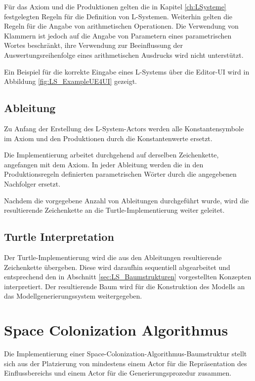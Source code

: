 Für das Axiom und die Produktionen gelten die in Kapitel \ref{ch:LSysteme} festgelegten Regeln für die Definition von L-Systemen. Weiterhin gelten die Regeln für die Angabe von arithmetischen Operationen. Die Verwendung von Klammern ist jedoch auf die Angabe von Parametern eines parametrischen Wortes beschränkt, ihre Verwendung zur Beeinflussung der Auswertungsreihenfolge eines arithmetischen Ausdrucks wird nicht unterstützt.

Ein Beispiel für die korrekte Eingabe eines L-Systems über die Editor-UI wird in Abbildung \ref{fig:LS_ExampleUE4UI} gezeigt.

\subsection{Ableitung}

Zu Anfang der Erstellung des L-System-Actors werden alle Konstantensymbole im Axiom und den Produktionen durch die Konstantenwerte ersetzt. 

Die Implementierung arbeitet durchgehend auf derselben Zeichenkette, angefangen mit dem Axiom. In jeder Ableitung werden die in den Produktionsregeln definierten parametrischen Wörter durch die angegebenen Nachfolger ersetzt.

Nachdem die vorgegebene Anzahl von Ableitungen durchgeführt wurde, wird die resultierende Zeichenkette an die Turtle-Implementierung weiter geleitet.

\subsection{Turtle Interpretation} \label{subsec:TurtleInterpretationImplementation}

Der Turtle-Implementierung wird die aus den Ableitungen resultierende Zeichenkette übergeben. Diese wird daraufhin sequentiell abgearbeitet und entsprechend den in Abschnitt \ref{sec:LS_Baumstrukturen} vorgestellten Konzepten interpretiert. Der resultierende Baum wird für die Konstruktion des Modells an das Modellgenerierungssystem weitergegeben.

\section{Space Colonization Algorithmus} \label{sec:ImplementierungSCA}

Die Implementierung einer Space-Colonization-Algorithmus-Baumstruktur stellt sich aus der Platzierung von mindestens einem Actor für die Repräsentation des Einflussbereichs und einem Actor für die Generierungsprozedur zusammen.

